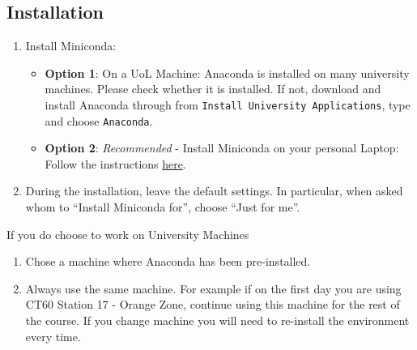 \documentclass[
  letterpaper,
  DIV=11,
  numbers=noendperiod]{scrreprt}
\providecommand{\tightlist}{%
  \setlength{\itemsep}{0pt}\setlength{\parskip}{0pt}}\usepackage{longtable,booktabs,array}
\begin{document}

\subsection*{Installation}\label{installation}

\begin{enumerate}
\def\labelenumi{\arabic{enumi}.}
\item
  Install Miniconda:

  \begin{itemize}
  \item
    \textbf{Option 1}: On a UoL Machine: Anaconda is installed on many
    university machines. Please check whether it is installed. If not,
    download and install Anaconda through from
    \texttt{Install\ University\ Applications}, type and choose
    \texttt{Anaconda}.
  \item
    \textbf{Option 2}: \emph{Recommended} - Install Miniconda on your
    personal Laptop: Follow the instructions
    \href{https://docs.conda.io/projects/miniconda/en/latest/miniconda-install.html}{here}.
  \end{itemize}
\item
  During the installation, leave the default settings. In particular,
  when asked whom to ``Install Miniconda for'', choose ``Just for me''.
\end{enumerate}

\begin{tcolorbox}[enhanced jigsaw, breakable, toptitle=1mm, titlerule=0mm, opacityback=0, colback=white, coltitle=black, leftrule=.75mm, bottomtitle=1mm, colframe=quarto-callout-caution-color-frame, colbacktitle=quarto-callout-caution-color!10!white, toprule=.15mm, bottomrule=.15mm, arc=.35mm, rightrule=.15mm, opacitybacktitle=0.6, title=\textcolor{quarto-callout-caution-color}{\faFire}\hspace{0.5em}{University Machines}, left=2mm]

If you do choose to work on University Machines

\begin{enumerate}
\def\labelenumi{\arabic{enumi}.}
\tightlist
\item
  Chose a machine where Anaconda has been pre-installed.
\item
  Always use the same machine. For example if on the first day you are
  using CT60 Station 17 - Orange Zone, continue using this machine for
  the rest of the course. If you change machine you will need to
  re-install the environment every time.
\end{enumerate}

\end{tcolorbox}
\end{document}
